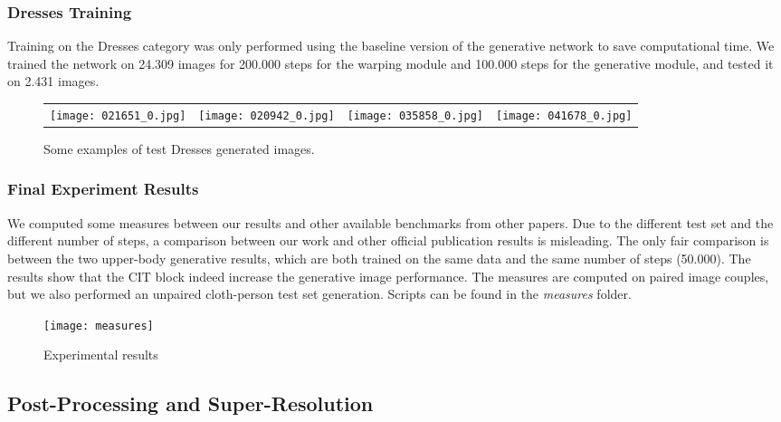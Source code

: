 \subsubsection{Dresses Training}

Training on the Dresses category was only performed using the baseline version of the generative network to save computational time. We trained the network on 24.309 images for 200.000 steps for the warping module and 100.000 steps for the generative module, and tested it on 2.431 images.


\begin{figure}[h]
\centering
\begin{tabular}{cccc}
{\texttt{[image: 021651\_0.jpg]}} &
{\texttt{[image: 020942\_0.jpg]}} &
{\texttt{[image: 035858\_0.jpg]}} &
{\texttt{[image: 041678\_0.jpg]}} \\
\end{tabular}

\caption{Some examples of test Dresses generated images.}
\end{figure}


\subsubsection{Final Experiment Results}
We computed some measures between our results and other available benchmarks from other papers. Due to the different test set and the different number of steps, a comparison between our work and other official publication results is misleading. The only fair comparison is between the two upper-body generative results, which are both trained on the same data and the same number of steps (50.000). The results show that the CIT block indeed increase the generative image performance. The measures are computed on paired image couples, but we also performed an unpaired cloth-person test set generation. Scripts can be found in the \textit{measures} folder.

\begin{figure}[h]
\centering
\texttt{[image: measures]}
\caption{Experimental results}
\label{fig:Measures}
\end{figure}

\subsection{Post-Processing and Super-Resolution}

